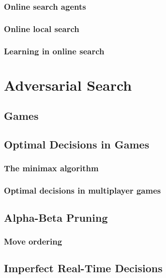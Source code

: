 \documentclass[11pt]{article}
\begin{document}
\subsubsection{Online search agents}


\subsubsection{Online local search}


\subsubsection{Learning in online search}


\newpage
\section{Adversarial Search}

\subsection{Games}


\subsection{Optimal Decisions in Games}


\subsubsection{The minimax algorithm}


\subsubsection{Optimal decisions in multiplayer games}


\subsection{Alpha-Beta Pruning}


\subsubsection{Move ordering}


\subsection{Imperfect Real-Time Decisions}
\end{document}
